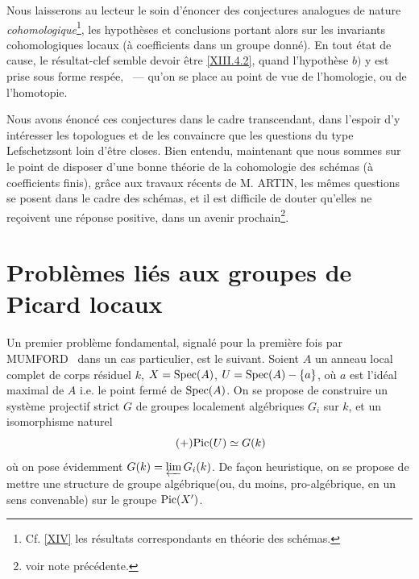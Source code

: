 Nous laisserons au lecteur le soin d'\'enoncer des conjectures analogues de nature \emph{cohomologique}\footnote{Cf. \Exp \ref{XIV} les r\'esultats correspondants en th\'eorie des sch\'emas.}, les hypoth\`eses et conclusions portant alors sur les invariants cohomologiques locaux (\`a coefficients dans un groupe donn\'e). En tout \'etat de cause, le r\'esultat-clef semble devoir \^etre \ref{XIII.4.2}, quand l'hypoth\`ese $b)$ y est prise sous forme resp\'ee, \ --- qu'on se place au point de vue de l'homologie, ou de l'homotopie.

Nous avons \'enonc\'e ces conjectures dans le cadre transcendant, dans
l'espoir d'y int\'eresser les topologues et de les convaincre que
les questions du type \og Lefschetz\fg sont loin d'\^etre closes.
Bien entendu, maintenant que nous sommes sur le point de disposer
d'une bonne th\'eorie de la cohomologie des sch\'emas (\`a coefficients
finis), gr\^ace aux travaux r\'ecents de M. ARTIN, les
m\^emes questions se posent dans le cadre des sch\'emas, et il est
difficile de douter qu'elles ne re\c coivent une r\'eponse positive,
dans un avenir prochain\footnote{voir note pr\'ec\'edente.}.

\section{Probl\`emes li\'es aux groupes de Picard locaux} \label{XIII.5}

Un premier probl\`eme fondamental, signal\'e pour la premi\`ere fois par MUMFORD~\cite{XIII.5} dans un cas particulier, est le suivant. Soient $A$ un anneau local complet de corps r\'esiduel $k$, $X=\operatorname{Spec}(A)$, $U=\operatorname{Spec}(A)-\{a\}$, o\`u $a$ est l'id\'eal maximal de $A$ i.e. le point ferm\'e de $\operatorname{Spec}(A)$. On se propose de construire un syst\`eme projectif strict $G$ de groupes localement alg\'ebriques $G_i$ sur $k$, et un isomorphisme naturel \begin{equation*} \label{eq:XIII.5.+} \tag{$+$} {\operatorname{Pic}(U)\simeq G(k)} \end{equation*} o\`u on pose \'evidemment $G(k)=\varprojlim G_i(k)$. De fa\c con heuristique, on se propose de \og mettre une structure de groupe alg\'ebrique\fg (ou, du moins, pro-alg\'ebrique, en un sens convenable) sur le groupe $\operatorname{Pic}(X')$.


